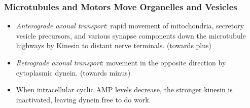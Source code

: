 \documentclass[12pt,a4paper]{article}
\begin{document}
\subsubsection{Microtubules and Motors Move Organelles and Vesicles}
\begin{itemize}
    \item \textit{Anterograde axonal transport}: rapid movement of mitochondria, secretory vesicle precursors, and various synapse components down the microtubule highways by Kinesin to distant nerve terminals. (towards plus)
    \item \textit{Retrograde axonal transport}: movement in the opposite direction by cytoplasmic dynein. (towards minus)
    \item When intracellular cyclic AMP levels decrease, the stronger kinesin is inactivated, leaving dynein free to do work.
\end{itemize}


\end{document}
